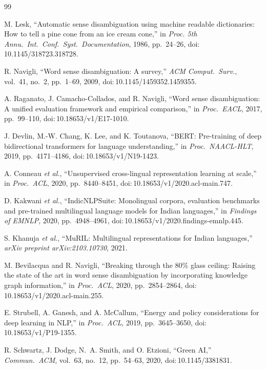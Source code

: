 \documentclass[conference]{IEEEtran}
\begin{document}
\begin{thebibliography}{99}

M. Lesk, ``Automatic sense disambiguation using machine readable dictionaries:
How to tell a pine cone from an ice cream cone,'' in \emph{Proc. 5th Annu.\ Int.\ Conf.\ Syst.\ Documentation}, 1986, pp.~24--26,
doi:\,10.1145/318723.318728.

R. Navigli, ``Word sense disambiguation: A survey,'' \emph{ACM Comput.\ Surv.},
vol.~41, no.~2, pp.~1--69, 2009, doi:\,10.1145/1459352.1459355.

A. Raganato, J. Camacho-Collados, and R. Navigli, ``Word sense disambiguation:
A unified evaluation framework and empirical comparison,'' in
\emph{Proc.\ EACL}, 2017, pp.~99--110, doi:\,10.18653/v1/E17-1010.

J. Devlin, M.-W. Chang, K. Lee, and K. Toutanova, ``BERT: Pre-training of deep
bidirectional transformers for language understanding,'' in
\emph{Proc.\ NAACL-HLT}, 2019, pp.~4171--4186, doi:\,10.18653/v1/N19-1423.

A. Conneau \emph{et al.}, ``Unsupervised cross-lingual representation learning
at scale,'' in \emph{Proc.\ ACL}, 2020, pp.~8440--8451,
doi:\,10.18653/v1/2020.acl-main.747.

D. Kakwani \emph{et al.}, ``IndicNLPSuite: Monolingual corpora, evaluation
benchmarks and pre-trained multilingual language models for Indian languages,''
in \emph{Findings of EMNLP}, 2020, pp.~4948--4961,
doi:\,10.18653/v1/2020.findings-emnlp.445.

S. Khanuja \emph{et al.}, ``MuRIL: Multilingual representations for Indian
languages,'' \emph{arXiv preprint arXiv:2103.10730}, 2021.

M. Bevilacqua and R. Navigli, ``Breaking through the 80\% glass ceiling:
Raising the state of the art in word sense disambiguation by incorporating
knowledge graph information,'' in \emph{Proc.\ ACL}, 2020, pp.~2854--2864,
doi:\,10.18653/v1/2020.acl-main.255.

E. Strubell, A. Ganesh, and A. McCallum, ``Energy and policy considerations for
deep learning in NLP,'' in \emph{Proc.\ ACL}, 2019, pp.~3645--3650,
doi:\,10.18653/v1/P19-1355.

R. Schwartz, J. Dodge, N.~A. Smith, and O. Etzioni, ``Green AI,''
\emph{Commun.\ ACM}, vol.~63, no.~12, pp.~54--63, 2020,
doi:\,10.1145/3381831.

\balance
\end{thebibliography}
\end{document}
